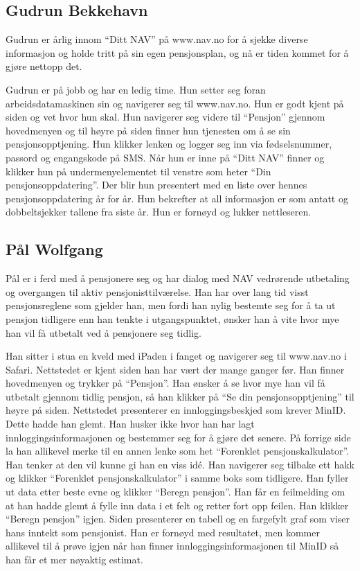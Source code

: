 \documentclass[informationsecurity]{gucmasterproject}
\begin{document}
\subsection{Gudrun Bekkehavn}
Gudrun er årlig innom “Ditt NAV” på www.nav.no for å sjekke diverse informasjon og holde tritt på sin egen pensjonsplan, og nå er tiden kommet for å gjøre nettopp det.

Gudrun er på jobb og har en ledig time. Hun setter seg foran arbeidsdatamaskinen sin og navigerer seg til www.nav.no. Hun er godt kjent på siden og vet hvor hun skal. Hun navigerer seg videre til “Pensjon” gjennom hovedmenyen og til høyre på siden finner hun tjenesten om å se sin pensjonsopptjening. Hun klikker lenken og logger seg inn via fødselsnummer, passord og engangskode på SMS. Når hun er inne på “Ditt NAV” finner og klikker hun på undermenyelementet til venstre som heter “Din pensjonsoppdatering”. Der blir hun presentert med en liste over hennes pensjonsoppdatering år for år. Hun bekrefter at all informasjon er som antatt og dobbeltsjekker tallene fra siste år. Hun er fornøyd og lukker nettleseren.

\subsection{Pål Wolfgang}
Pål er i ferd med å pensjonere seg og har dialog med NAV vedrørende utbetaling og overgangen til aktiv pensjonisttilværelse. Han har over lang tid visst pensjonsreglene som gjelder han, men fordi han nylig bestemte seg for å ta ut pensjon tidligere enn han tenkte i utgangspunktet, ønsker han å vite hvor mye han vil få utbetalt ved å pensjonere seg tidlig. 

Han sitter i stua en kveld med iPaden i fanget og navigerer seg til www.nav.no i Safari. Nettstedet er kjent siden han har vært der mange ganger før. Han finner hovedmenyen og trykker på “Pensjon”. Han ønsker å se hvor mye han vil få utbetalt gjennom tidlig pensjon, så han klikker på “Se din pensjonsopptjening” til høyre på siden. Nettstedet presenterer en innloggingsbeskjed som krever MinID. Dette hadde han glemt. Han husker ikke hvor han har lagt innloggingsinformasjonen og bestemmer seg for å gjøre det senere. På forrige side la han allikevel merke til en annen lenke som het “Forenklet pensjonskalkulator”. Han tenker at den vil kunne gi han en viss idé. Han navigerer seg tilbake ett hakk og klikker “Forenklet pensjonskalkulator” i samme boks som tidligere. Han fyller ut data etter beste evne og klikker “Beregn pensjon”. Han får en feilmelding om at han hadde glemt å fylle inn data i et felt og retter fort opp feilen. Han klikker “Beregn pensjon” igjen. Siden presenterer en tabell og en fargefylt graf som viser hans inntekt som pensjonist. Han er fornøyd med resultatet, men kommer allikevel til å prøve igjen når han finner innloggingsinformasjonen til MinID så han får et mer nøyaktig estimat.
\end{document}
